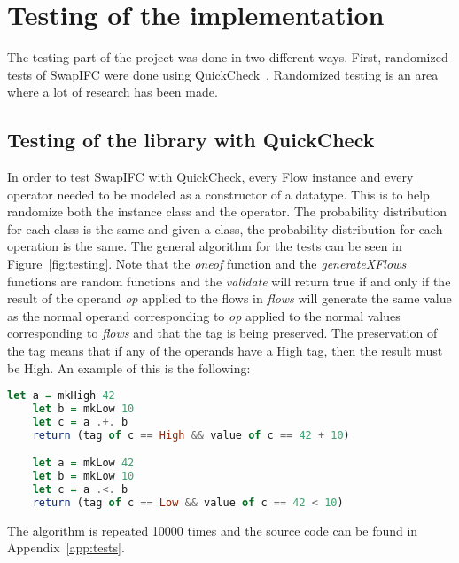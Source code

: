 \section{Testing of the implementation}
The testing part of the project was done in two different ways. First, randomized tests of SwapIFC were done using QuickCheck~\cite{quickcheck, quickcheck-wiki}. Randomized testing is an area where a lot of research has been made.
\subsection{Testing of the library with QuickCheck}
In order to test SwapIFC with QuickCheck, every Flow instance and every operator needed to be modeled as a constructor of a datatype. This is to help randomize both the instance class and the operator. The probability distribution for each class is the same and given a class, the probability distribution for each operation is the same. The general algorithm for the tests can be seen in Figure~\ref{fig:testing}. Note that the \emph{oneof} function and the \emph{generateXFlows} functions are random functions and the \emph{validate} will return true if and only if the result of the operand \emph{op} applied to the flows in \emph{flows} will generate the same value as the normal operand corresponding to \emph{op} applied to the normal values corresponding to \emph{flows} and that the tag is being preserved. The preservation of the tag means that if any of the operands have a High tag, then the result must be High. An example of this is the following:
\begin{center}
  \begin{lstlisting}[language=Haskell]
    let a = mkHigh 42
    let b = mkLow 10
    let c = a .+. b
    return (tag of c == High && value of c == 42 + 10)

    let a = mkLow 42
    let b = mkLow 10
    let c = a .<. b
    return (tag of c == Low && value of c == 42 < 10)
  \end{lstlisting}
\end{center}
The algorithm is repeated 10000 times and the source code can be found in Appendix~\ref{app:tests}.

